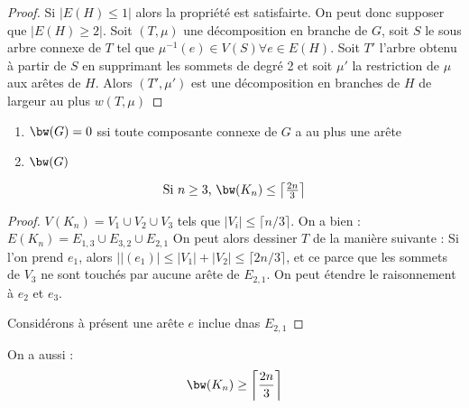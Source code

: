 \documentclass[a4paper, 11pt]{thesis}
\begin{document}
\begin{proof}
    Si $|E(H) \leq 1|$ alors la propriété est satisfairte. On peut donc supposer que $|E(H) \geq
    2|$. Soit $(T, \mu)$ une décomposition en branche de $G$, soit $S$ le sous arbre connexe de $T$
    tel que $\mu^{-1}(e) \in V(S) \forall e \in E(H)$. Soit $T'$ l'arbre obtenu à partir de $S$ en
    supprimant les sommets de degré 2 et soit $\mu'$ la restriction de $\mu$ aux arêtes de $H$.
    Alors $(T', \mu')$ est une décomposition en branches de $H$ de largeur au plus $w(T, \mu)$
\end{proof}

\begin{prop}
    \begin{enumerate}
        \item $\bw(G) = 0$ ssi toute composante connexe de $G$ a au plus une arête
        \item $\bw(G)$ %
    \end{enumerate}
\end{prop}

\begin{prop}
    \begin{displaymath}
        \mbox{Si }n \geq 3$, $\bw(K_n) \leq \left \lceil \frac{2n}{3} \right \rceil
    \end{displaymath}
\end{prop}

\begin{proof}
    $V(K_n) = V_1 \cup V_2 \cup V_3$ tels que $|V_i| \leq \lceil n/3 \rceil$.
    On a bien : $E(K_n) = E_{1,3} \cup E_{3,2} \cup E_{2,1}$
    On peut alors dessiner $T$ de la manière suivante :
    Si l'on prend $e_1$, alors $|\mid(e_1)| \leq |V_1| + |V_2| \leq \lceil 2n/3 \rceil$, et ce parce
    que les sommets de $V_3$ ne sont touchés par aucune arête de $E_{2,1}$. On peut étendre le
    raisonnement à $e_2$ et $e_3$. 

    Considérons à présent une arête $e$ inclue dnas $E_{2,1}$
\end{proof}

\begin{prop}
    On a aussi :
    \begin{displaymath}
        \bw(K_n) \geq \left \lceil \frac{2n}{3} \right \rceil
    \end{displaymath}
\end{prop}
\end{document}
